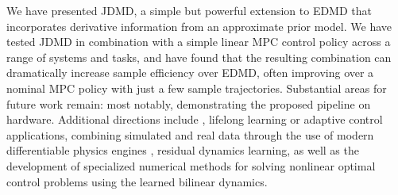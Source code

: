 \documentclass[../root.tex]{subfiles}
\begin{document}
We have presented JDMD, a simple but powerful extension to EDMD that
incorporates derivative information from an approximate prior model. We have
tested JDMD in combination with a simple linear MPC control policy across a
range of systems and tasks, and have found that the resulting combination can
dramatically increase sample efficiency over EDMD, often improving over a
nominal MPC policy with just a few sample trajectories.  Substantial areas for future work
remain: most notably, demonstrating the proposed pipeline on hardware.
Additional directions include ,
lifelong learning or adaptive control applications, combining simulated and real
data through the use of modern differentiable physics engines
\cite{todorov_MuJoCo_2012,howell_Dojo_2022}, residual dynamics learning, as well
as the development of specialized numerical methods for solving nonlinear
optimal control problems using the learned bilinear dynamics.
\end{document}
